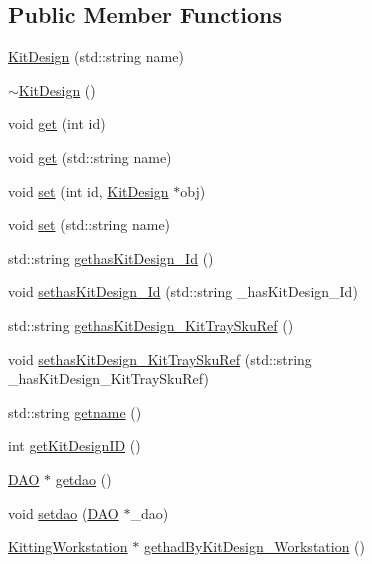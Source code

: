 \subsection*{Public Member Functions}
\begin{DoxyCompactItemize}
\item 
\hyperlink{class_kit_design_aa28c4870ca5c4626face2038a4d959de}{KitDesign} (std::string name)
\item 
\hyperlink{class_kit_design_a952bc7e3a1d0aef97317ba581ebf2780}{$\sim$KitDesign} ()
\item 
void \hyperlink{class_kit_design_a671fab4903d3eee18e7a2bd7973f344f}{get} (int id)
\item 
void \hyperlink{class_kit_design_ac546195ec86a56f3581804b77128014a}{get} (std::string name)
\item 
void \hyperlink{class_kit_design_a7465dd4125eb6d46f6f4598cc5d033f7}{set} (int id, \hyperlink{class_kit_design}{KitDesign} $\ast$obj)
\item 
void \hyperlink{class_kit_design_abf2d5f0803a8002ede4a777a6fa53cbf}{set} (std::string name)
\item 
std::string \hyperlink{class_kit_design_aa71a8b138623e34f84eadd714d06dfe8}{gethasKitDesign\_\-Id} ()
\item 
void \hyperlink{class_kit_design_a951e87f587842e225aabf46f92403730}{sethasKitDesign\_\-Id} (std::string \_\-hasKitDesign\_\-Id)
\item 
std::string \hyperlink{class_kit_design_ad8f0f7f6ec09c4a843289ac740802710}{gethasKitDesign\_\-KitTraySkuRef} ()
\item 
void \hyperlink{class_kit_design_ab4d97388a048a5dd4bcbf0a91ac98b93}{sethasKitDesign\_\-KitTraySkuRef} (std::string \_\-hasKitDesign\_\-KitTraySkuRef)
\item 
std::string \hyperlink{class_kit_design_a83ed6018e368cdbe15355b6a124fc221}{getname} ()
\item 
int \hyperlink{class_kit_design_a44517e292a6b49c4a680425be8bb3dfa}{getKitDesignID} ()
\item 
\hyperlink{class_d_a_o}{DAO} $\ast$ \hyperlink{class_kit_design_af11875a1c4f876c2e328f94e38d900ce}{getdao} ()
\item 
void \hyperlink{class_kit_design_aea131638fcfa0e95c9152a60d62e0233}{setdao} (\hyperlink{class_d_a_o}{DAO} $\ast$\_\-dao)
\item 
\hyperlink{class_kitting_workstation}{KittingWorkstation} $\ast$ \hyperlink{class_kit_design_af5a07710e0bbd57bd2861370003b8770}{gethadByKitDesign\_\-Workstation} ()

\end{DoxyCompactItemize}

